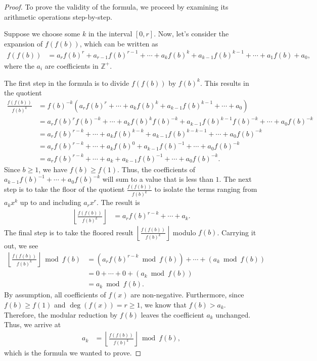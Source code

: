 \documentclass[10pt,a4paper]{article}
\theoremstyle{plain}
\newcommand{\floor}[1]{\left\lfloor #1 \right\rfloor}
\newcommand{\Z}{\mathbb{Z}}
\begin{document}
\begin{proof}
To prove the validity of the formula, we proceed by examining its arithmetic operations step-by-step.

Suppose we choose some $k$ in the interval $[0,r]$. Now, let's consider the expansion of $f(f(b))$, which can be written as
\begin{align*}
f(f(b)) &= a_r f(b)^r + a_{r-1} f(b)^{r-1} + \cdots + a_{k} f(b)^{k} + a_{k-1} f(b)^{k-1} + \cdots + a_1 f(b) + a_0 ,
\end{align*}
where the $a_i$ are coefficients in $\Z^+$.

The first step in the formula is to divide $f(f(b))$ by $f(b)^k$. This results in the quotient
\begin{align*}
\frac{f(f(b))}{f(b)^k} &= f(b)^{-k} (a_r f(b)^r  + \cdots + a_k f(b)^k + a_{k-1} f(b)^{k-1} + \cdots + a_0) \\
&= a_r f(b)^r f(b)^{-k} + \cdots + a_{k} f(b)^{k} f(b)^{-k} + a_{k-1} f(b)^{k-1} f(b)^{-k} + \cdots + a_0 f(b)^{-k} \\
&= a_r f(b)^{r-k} + \cdots + a_{k} f(b)^{k-k} + a_{k-1} f(b)^{k-k-1} + \cdots + a_0 f(b)^{-k}  \\
&= a_r f(b)^{r-k} + \cdots + a_{k} f(b)^{0} + a_{k-1} f(b)^{-1} + \cdots + a_0 f(b)^{-k}  \\
&= a_r f(b)^{r-k} + \cdots + a_{k} + a_{k-1} f(b)^{-1} + \cdots + a_0 f(b)^{-k} .
\end{align*}
Since $b \geq 1$, we have $f(b) \geq f(1)$. Thus, the coefficients of $a_{k-1} f(b)^{-1} + \cdots + a_0 f(b)^{-k}$ will sum to a value that is less than $1$. The next step is to take the floor of the quotient $\frac{f(f(b))}{f(b)^k}$ to isolate the terms ranging from $a_k x^k$ up to and including $a_r x^r$. The result is
\begin{align*}
\floor{\frac{f(f(b))}{f(b)^k}} &= a_r f(b)^{r-k} + \cdots + a_{k} .
\end{align*}
The final step is to take the floored result $\floor{\frac{f(f(b))}{f(b)^k}}$ modulo $f(b)$. Carrying it out, we see
\begin{align*}
\floor{\frac{f(f(b))}{f(b)^k}} \bmod{f(b)} &= (a_r f(b)^{r-k} \bmod{f(b)}) + \cdots + (a_k \bmod{f(b)}) \\
&= 0 + \cdots + 0 + (a_k \bmod{f(b)}) \\
&= a_k \bmod{f(b)} .
\end{align*}
By assumption, all coefficients of $f(x)$ are non-negative. Furthermore, since $f(b) \geq f(1)$ and $\deg(f(x)) = r \geq 1$, we know that $f(b) > a_k$. Therefore, the modular reduction by $f(b)$ leaves the coefficient $a_k$ unchanged. Thus, we arrive at
\begin{align*}
a_k &= \floor{\frac{f(f(b))}{f(b)^k}} \bmod{f(b)} ,
\end{align*}
which is the formula we wanted to prove.
\end{proof}
\end{document}

